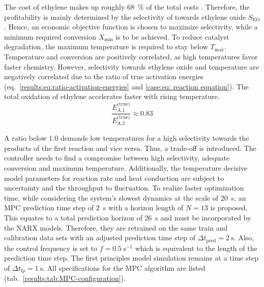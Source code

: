 \noindent
The cost of ethylene makes up roughly \SI{68}{\%} of the total costs \cite{pietschak2018}. Therefore, the
profitability is mainly determined by the selectivity of towards ethylene oxide $S_\text{EO}$.
Hence, an economic objective function is chosen to maximize selectivity, while a minimum required
conversion $X_\text{min}$ is to be achieved. To reduce catalyst degradation, the maximum temperature is required
to stay below $T_\text{max}$. 
Temperature and conversion are positively correlated, as high temperatures favor faster chemistry.
However, selectivity towards ethylene oxide and temperature are negatively correlated due to the 
ratio of true activation energies (eq.~\ref{results:eq:ratio-activation-energies} and \ref{case:eq: reaction equation}).
The total oxidation of ethylene accelerates faster with rising temperature.
\newline
\begin{equation}
    \label{results:eq:ratio-activation-energies}
    \frac{E_\text{A,1}^{\text{(true)}}}{E_\text{A,2}^{\text{(true)}}} \approx 0.83
\end{equation}

\noindent
A ratio below $1.0$ demands low temperatures for a high selectivity towards the products of the first reaction
and vice versa.
Thus, a trade-off is introduced. The controller needs to find a compromise between high selectivity,
adequate conversion and maximum temperature. Additionally, the temperature decisive model parameters 
for reaction rate and heat conduction are subject to uncertainty and the throughput to fluctuation.
To realize faster optimization time, while considering the system's slowest dynamics at
the scale of \SI{20}{\second}, an MPC prediction time step of \SI{2}{\second} with a horizon length of 
$N = 13$ is proposed. This equates to a total prediction horizon of \SI{26}{\second} and
must be incorporated by the NARX models. Therefore, they are retrained on the same train and calibration
data sets with an adjusted prediction time step of  $\Delta t_\text{pred} = \SI{2}{\second}$.
Also, the control frequency
is set to $f = \SI{0.5}{\second^{-1}}$ which is equivalent to the length of the prediction time step.
The first principles model simulation remains at a time step of $\Delta t_\text{fp} = \SI{1}{\second}$.
All specifications for the MPC algorithm are listed (tab.~\ref{results:tab:MPC-configuration}).


